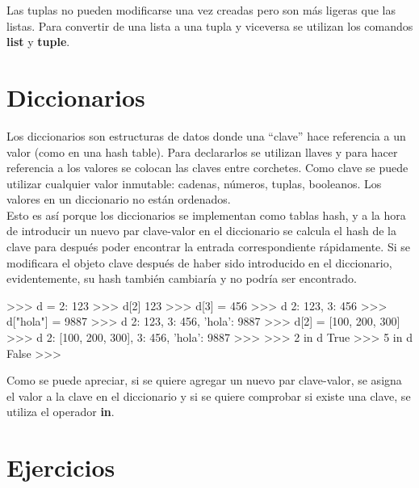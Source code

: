 Las tuplas no pueden modificarse una vez creadas pero son más ligeras que las listas. Para convertir de una lista a una tupla y viceversa se utilizan los comandos \textbf{list} y \textbf{tuple}.

\section{Diccionarios}

Los diccionarios son estructuras de datos donde una ``clave'' hace referencia a un valor (como en una hash table). Para declararlos se utilizan llaves y para hacer referencia a los valores se colocan las claves entre corchetes. Como clave se puede utilizar cualquier valor inmutable: cadenas, números, tuplas, booleanos. Los valores en un diccionario no están ordenados.\\

Esto es así porque los diccionarios se implementan como tablas hash, y a la hora de introducir un nuevo par clave-valor en el diccionario se calcula el hash de la clave para después poder encontrar la entrada correspondiente rápidamente. Si se modificara el objeto clave después de haber sido introducido en el diccionario, evidentemente, su hash también cambiaría y no podría ser encontrado.\\

\begin{pyglist} [language=python]
>>> d = {2: 123}
>>> d[2]
123
>>> d[3] = 456
>>> d
{2: 123, 3: 456}
>>> d["hola"] = 9887
>>> d
{2: 123, 3: 456, 'hola': 9887}
>>> d[2] = [100, 200, 300]
>>> d
{2: [100, 200, 300], 3: 456, 'hola': 9887}
>>> 
>>> 2 in d
True
>>> 5 in d
False
>>> 

\end{pyglist}

Como se puede apreciar, si se quiere agregar un nuevo par clave-valor, se asigna el valor a la clave en el diccionario y si se quiere comprobar si existe una clave, se utiliza el operador \textbf{in}.


\section{Ejercicios}

